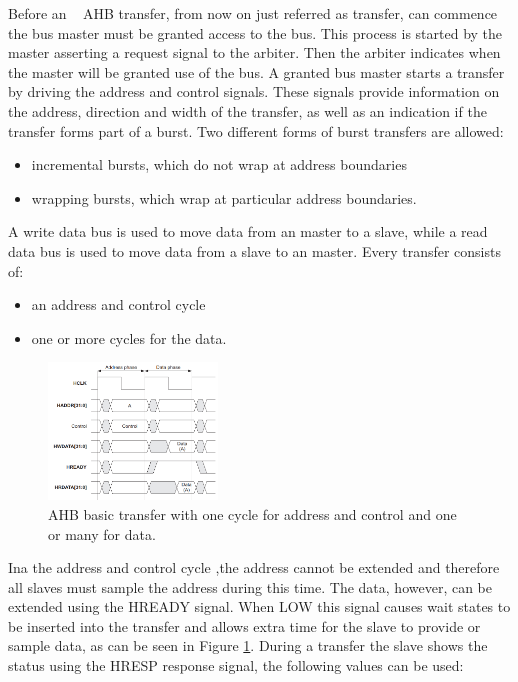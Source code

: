 Before an \amba~ AHB transfer, from now on just referred as transfer, can commence the bus master must be granted access to the bus. This process is started by the master asserting a request signal to the arbiter. Then the arbiter indicates when the master will be granted use of the bus. A granted bus master starts a transfer by driving the address and control signals. These signals provide information on the address, direction and width of the transfer, as well as an indication if the transfer forms part of a burst. Two different forms of burst transfers are allowed:
\begin{itemize}
\item incremental bursts, which do not wrap at address boundaries
\item wrapping bursts, which wrap at particular address boundaries.
\end{itemize}

A write data bus is used to move data from an master to a slave, while a read data bus
is used to move data from a slave to an master.
Every transfer consists of:

\begin{itemize}
\item an address and control cycle
\item one or more cycles for the data.
\end{itemize}

\begin{figure}[!ht]
    \centering
    \includegraphics[width=0.4\textwidth]{figures/others/simple_ahb_transfer.png}
    \caption{AHB basic transfer with one cycle for address and control and one or many for data.}
    \label{fig:basic_ahb_transfer}
\end{figure}


Ina the address and control cycle ,the address cannot be extended and therefore all slaves must sample the address during this time. The data, however, can be extended using the HREADY signal. When LOW this signal causes wait states to be inserted into the transfer and allows extra time for the slave to provide or sample data, as can be seen in Figure \ref{fig:basic_ahb_transfer}. During a transfer the slave shows the status using the HRESP response signal, the following values can be used:


